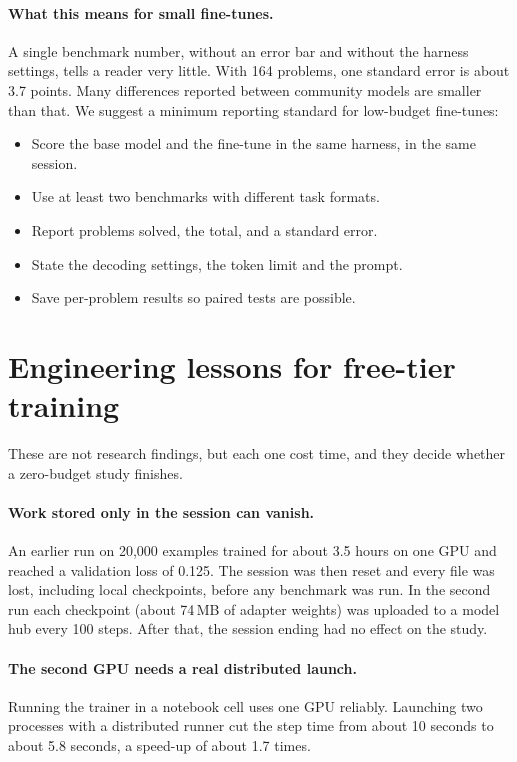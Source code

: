 \documentclass[11pt,a4paper]{article}
\begin{document}
\paragraph{What this means for small fine-tunes.} A single benchmark number, without an error bar and without the harness settings, tells a reader very little. With 164 problems, one standard error is about 3.7 points. Many differences reported between community models are smaller than that. We suggest a minimum reporting standard for low-budget fine-tunes:
\begin{itemize}
\item Score the base model and the fine-tune in the same harness, in the same session.
\item Use at least two benchmarks with different task formats.
\item Report problems solved, the total, and a standard error.
\item State the decoding settings, the token limit and the prompt.
\item Save per-problem results so paired tests are possible.
\end{itemize}

\section{Engineering lessons for free-tier training}
These are not research findings, but each one cost time, and they decide whether a zero-budget study finishes.

\paragraph{Work stored only in the session can vanish.} An earlier run on 20,000 examples trained for about 3.5 hours on one GPU and reached a validation loss of 0.125. The session was then reset and every file was lost, including local checkpoints, before any benchmark was run. In the second run each checkpoint (about 74\,MB of adapter weights) was uploaded to a model hub every 100 steps. After that, the session ending had no effect on the study.

\paragraph{The second GPU needs a real distributed launch.} Running the trainer in a notebook cell uses one GPU reliably. Launching two processes with a distributed runner cut the step time from about 10 seconds to about 5.8 seconds, a speed-up of about 1.7 times.
\end{document}
